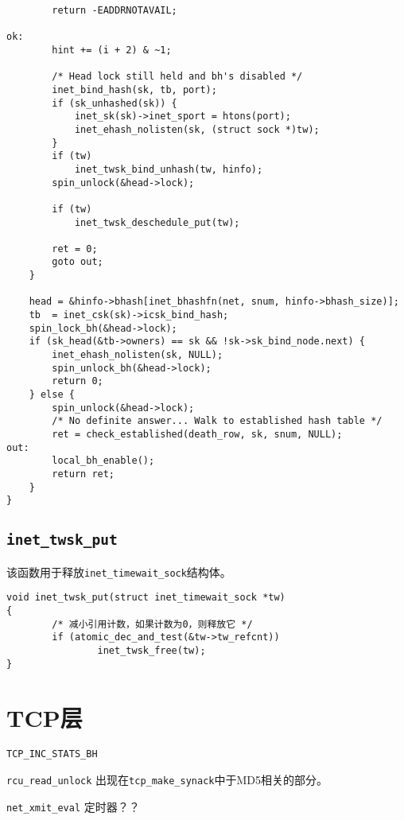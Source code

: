 \begin{verbatim}
        return -EADDRNOTAVAIL;

ok:
        hint += (i + 2) & ~1;

        /* Head lock still held and bh's disabled */
        inet_bind_hash(sk, tb, port);
        if (sk_unhashed(sk)) {
            inet_sk(sk)->inet_sport = htons(port);
            inet_ehash_nolisten(sk, (struct sock *)tw);
        }
        if (tw)
            inet_twsk_bind_unhash(tw, hinfo);
        spin_unlock(&head->lock);

        if (tw)
            inet_twsk_deschedule_put(tw);

        ret = 0;
        goto out;
    }

    head = &hinfo->bhash[inet_bhashfn(net, snum, hinfo->bhash_size)];
    tb  = inet_csk(sk)->icsk_bind_hash;
    spin_lock_bh(&head->lock);
    if (sk_head(&tb->owners) == sk && !sk->sk_bind_node.next) {
        inet_ehash_nolisten(sk, NULL);
        spin_unlock_bh(&head->lock);
        return 0;
    } else {
        spin_unlock(&head->lock);
        /* No definite answer... Walk to established hash table */
        ret = check_established(death_row, sk, snum, NULL);
out:
        local_bh_enable();
        return ret;
    }
}
\end{verbatim}

\subsection{\texttt{inet_twsk_put}}
该函数用于释放\texttt{inet_timewait_sock}结构体。
\begin{verbatim}
void inet_twsk_put(struct inet_timewait_sock *tw)
{
        /* 减小引用计数，如果计数为0，则释放它 */
        if (atomic_dec_and_test(&tw->tw_refcnt))
                inet_twsk_free(tw);
}
\end{verbatim}

\section{TCP层}

    \texttt{TCP_INC_STATS_BH}

    \texttt{rcu_read_unlock} 出现在\texttt{tcp_make_synack}中于MD5相关的部分。
    
    \texttt{net_xmit_eval}   定时器？？
